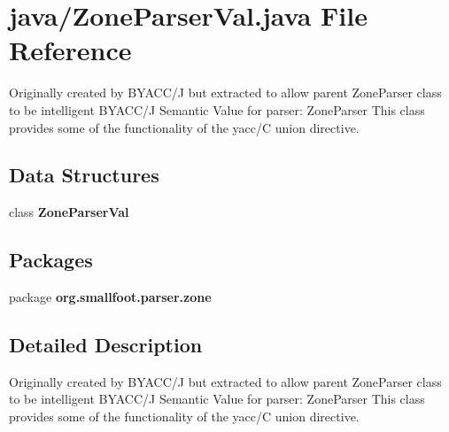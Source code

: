 \section{java/\+Zone\+Parser\+Val.java File Reference}
\label{ZoneParserVal_8java}


Originally created by B\+Y\+A\+C\+C/\+J but extracted to allow parent Zone\+Parser class to be intelligent B\+Y\+A\+C\+C/\+J Semantic Value for parser\+: Zone\+Parser This class provides some of the functionality of the yacc/\+C \textquotesingle{}union\textquotesingle{} directive.  


\subsection*{Data Structures}
\begin{DoxyCompactItemize}
\item 
class {\bf Zone\+Parser\+Val}
\end{DoxyCompactItemize}
\subsection*{Packages}
\begin{DoxyCompactItemize}
\item 
package {\bf org.\+smallfoot.\+parser.\+zone}
\end{DoxyCompactItemize}


\subsection{Detailed Description}
Originally created by B\+Y\+A\+C\+C/\+J but extracted to allow parent Zone\+Parser class to be intelligent B\+Y\+A\+C\+C/\+J Semantic Value for parser\+: Zone\+Parser This class provides some of the functionality of the yacc/\+C \textquotesingle{}union\textquotesingle{} directive. 

